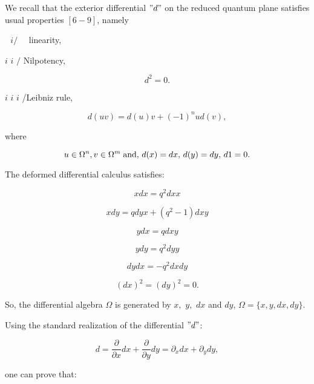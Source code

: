 \documentclass[a4paper,12pt,thmsa]{article}
\begin{document}
We recall that the exterior differential $"d"$ on the reduced quantum plane
satisfies usual properties $[6-9]$, namely

$\ \ \ i/$ \ \ linearity,

$i$ $i$ $/$ Nilpotency,

\begin{equation}
d^2=0.
\end{equation}

$i$ $i$ $i$ /Leibniz rule,

\begin{equation}
d(uv)=d(u)v+(-1)^nud(v),
\end{equation}

where

\begin{equation}
u\in \Omega ^n,v\in \Omega ^m\;\hbox{and},\, d(x)=dx,\, d(y)=dy,%
\, d1=0.
\end{equation}

The deformed differential calculus satisfies:

\begin{equation}
xdx=q^2dxx
\end{equation}

\begin{equation}
xdy=qdyx+(q^2-1)dxy
\end{equation}

\begin{equation}
ydx=qdxy
\end{equation}

\begin{equation}
ydy=q^2dyy
\end{equation}

\begin{equation}
dydx=-q^2dxdy
\end{equation}

\begin{equation}
(dx)^2=(dy)^2=0.
\end{equation}

So, the differential algebra $\Omega $ is generated by $x,$ $y,$ $dx$ and $%
dy $, $\Omega =\{x,y,dx,dy\}.$

Using the standard realization of the differential $"d"$:

\begin{equation}
d=\frac \partial {\partial x}dx+\frac \partial {\partial y}dy=\partial
_xdx+\partial _ydy,
\end{equation}

one can prove that:
\end{document}
